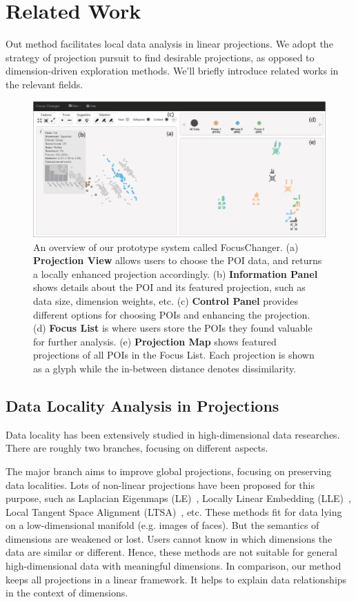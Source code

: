 \section{Related Work}
\label{section:relatedwork}
Out method facilitates local data analysis in linear projections. We adopt the strategy of projection pursuit to find desirable projections, as opposed to dimension-driven exploration methods. We'll briefly introduce related works in the relevant fields.

\begin{figure}[htbp]
\centering
  \includegraphics[width=0.92\linewidth]{images/teaser.eps}%
  \caption{An overview of our prototype system called FocusChanger. (a) \textbf{Projection View} allows users to choose the POI data, and returns a locally enhanced projection accordingly. (b) \textbf{Information Panel} shows details about the POI and its featured projection, such as data size, dimension weights, etc. (c) \textbf{Control Panel} provides different options for choosing POIs and enhancing the projection. (d) \textbf{Focus List} is where users store the POIs they found valuable for further analysis. (e) \textbf{Projection Map} shows featured projections of all POIs in the Focus List. Each projection is shown as a glyph while the in-between distance denotes dissimilarity.}
\label{fig:teaser}
  \end{figure}

\subsection{Data Locality Analysis in Projections}
Data locality has been extensively studied in high-dimensional data researches. There are roughly two branches, focusing on different aspects.

The major branch aims to improve global projections, focusing on preserving data localities. Lots of non-linear projections have been proposed for this purpose, such as Laplacian Eigenmaps (LE)~\cite{DBLP:journals/neco/BelkinN03}, Locally Linear Embedding (LLE)~\cite{roweis2000nonlinear}, Local Tangent Space Alignment (LTSA)~\cite{DBLP:journals/corr/cs-LG-0212008}, etc. These methods fit for data lying on a low-dimensional manifold (e.g. images of faces). But the semantics of dimensions are weakened or lost. Users cannot know in which dimensions the data are similar or different. Hence, these methods are not suitable for general high-dimensional data with meaningful dimensions. In comparison, our method keeps all projections in a linear framework. It helps to explain data relationships in the context of dimensions.

